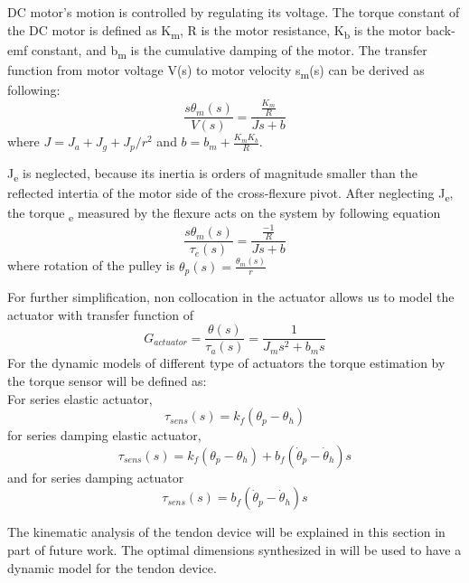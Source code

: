 \documentclass{article}
\begin{document}
DC motor's motion is controlled by regulating its voltage. The torque constant of the DC motor is defined as K\textsubscript{m}, R is  the motor resistance,  K\textsubscript{b} is the motor back-emf constant, and b\textsubscript{m} is the cumulative damping of the motor. The transfer function from motor voltage V(s) to motor velocity s\texttheta\textsubscript{m}(s) can be derived as following:
\begin{equation}
\frac{s\theta_m(s)}{V(s)}=\frac{\frac{K_m}{R}}{Js+b}
\end{equation}
where \(J=J_a+J_g+J_p/r^2\) and \(b=b_m+\frac{K_mK_b}{R}\).

J\textsubscript{e} is neglected, because its inertia is orders of magnitude smaller than the reflected intertia of the motor side of the cross-flexure pivot. After neglecting J\textsubscript{e}, the torque \texttau  \textsubscript{e} measured by the flexure acts on the system by following equation
\begin{equation}
\frac{s\theta_m(s)}{\tau_e(s)}=\frac{\frac{-1}{R}}{Js+b}
\end{equation}
where rotation of the pulley is \(\theta_p(s)=\frac{\theta_m(s)}{r}\)


For further simplification, non collocation in the actuator allows us to model the actuator with transfer function of
\begin{equation}
G_{actuator}=\frac{\theta(s)}{\tau_a(s)}=\frac{1}{J_ms^2+b_ms}
\end{equation}
For the dynamic models of different type of actuators the torque estimation by the torque sensor will be defined as:\\
For series elastic actuator,
\begin{equation}
\tau_{sens}(s)=k_f(\theta_p-\theta_h)
\end{equation}
for series damping elastic actuator,
\begin{equation}
\tau_{sens}(s)=k_f(\theta_p-\theta_h)+b_f(\dot\theta_p-\dot\theta_h)s
\end{equation}
and for series damping actuator
\begin{equation}
\tau_{sens}(s)=b_f(\dot\theta_p-\dot\theta_h)s
\end{equation}

The kinematic analysis of the tendon device will be explained in this section in part of future work. The optimal dimensions synthesized in\cite{ertas} will be used to have a dynamic model for the tendon device.
\end{document}
